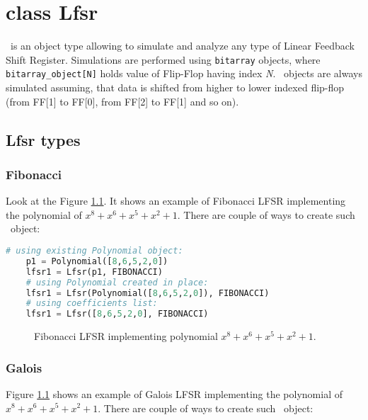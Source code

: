 \chapter{class Lfsr}

\Lfsr\ is an object type allowing to simulate and analyze any type of Linear Feedback Shift Register. Simulations are performed using \texttt{bitarray} objects, where \texttt{bitarray\_object[N]} holds value of Flip-Flop having index \textit{N}. \Lfsr\ objects are always simulated assuming, that data is shifted from higher to lower indexed flip-flop (from FF[1] to FF[0], from FF[2] to FF[1] and so on).

\section{Lfsr types}

\subsection{Fibonacci}


Look at the Figure \ref{lfsr:fibonacci}. It shows an example of Fibonacci LFSR implementing the polynomial of $x^8+x^6+x^5+x^2+1$. There are couple of ways to create such \Lfsr\ object:

\begin{lstlisting}[language=Python]
	# using existing Polynomial object:
	p1 = Polynomial([8,6,5,2,0])
	lfsr1 = Lfsr(p1, FIBONACCI)
	# using Polynomial created in place:
	lfsr1 = Lfsr(Polynomial([8,6,5,2,0]), FIBONACCI)
	# using coefficients list:
	lfsr1 = Lfsr([8,6,5,2,0], FIBONACCI)
\end{lstlisting}

\begin{figure}[h]
	\centering
	\scalebox{.75}{}
	\caption{Fibonacci LFSR implementing polynomial $x^8+x^6+x^5+x^2+1$.}
	\label{lfsr:fibonacci}
\end{figure}

\subsection{Galois}


Figure \ref{lfsr:fibonacci} shows an example of Galois LFSR implementing the polynomial of $x^8+x^6+x^5+x^2+1$. There are couple of ways to create such \Lfsr\ object:


